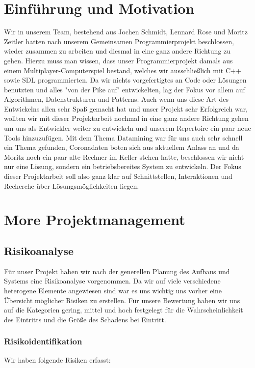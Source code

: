 \documentclass[12pt,oneside,a4paper,parskip]{scrbook}
\begin{document}
\chapter{Einführung und Motivation}\label{ch:intro}
Wir in unserem Team, bestehend aus Jochen Schmidt, Lennard Rose und Moritz Zeitler hatten nach unserem Gemeinsamen Programmierprojekt beschlossen, wieder zusammen zu arbeiten und diesmal in eine ganz andere Richtung zu gehen. Hierzu muss man wissen, dass unser Programmierprojekt damals aus einem Multiplayer-Computerspiel bestand, welches wir ausschließlich mit C++ sowie SDL programmierten. Da wir nichts vorgefertigtes an Code oder Lösungen benutzten und alles "von der Pike auf"  entwickelten, lag der Fokus vor allem auf Algorithmen, Datenstrukturen und Patterns. Auch wenn uns diese Art des Entwickelns allen sehr Spaß gemacht hat und unser Projekt sehr Erfolgreich war, wollten wir mit dieser Projektarbeit nochmal in eine ganz andere Richtung gehen um uns als Entwickler weiter zu entwickeln und unserem Repertoire ein paar neue Tools hinzuzufügen. Mit dem Thema Datamining war für uns auch sehr schnell ein Thema gefunden, Coronadaten boten sich aus aktuellem Anlass an und da Moritz noch ein paar alte Rechner im Keller stehen hatte, beschlossen wir nicht nur eine Lösung, sondern ein betriebsbereites System zu entwickeln. \newline
Der Fokus dieser Projektarbeit soll also ganz klar auf Schnittstellen, Interaktionen und Recherche über Lösungsmöglichkeiten liegen.

\chapter{More Projektmanagement}
\section{Risikoanalyse}
Für unser Projekt haben wir nach der generellen Planung des Aufbaus und Systems eine Risikoanalyse vorgenommen. Da wir auf viele verschiedene heterogene Elemente angewiesen sind war es uns wichtig uns vorher eine Übersicht möglicher Risiken zu erstellen. Für unsere Bewertung haben wir uns auf die Kategorien {gering, mittel und hoch} festgelegt für die Wahrscheinlichkeit des Eintritts und die Größe des Schadens bei Eintritt.
\subsection{Risikoidentifikation}
Wir haben folgende Risiken erfasst:
\end{document}
